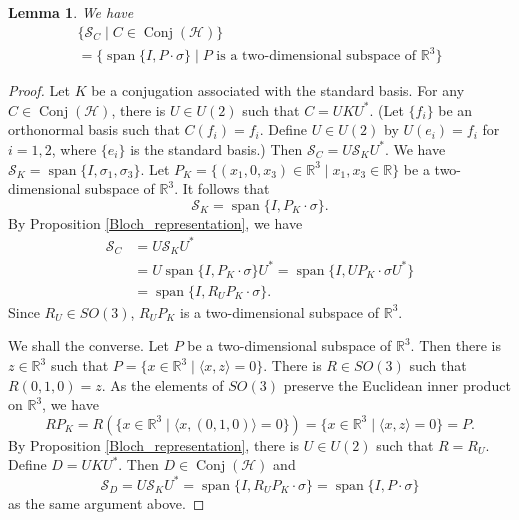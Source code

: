 \documentclass[11pt]{amsart}
\newtheorem{lemma}[theorem]{Lemma}
\theoremstyle{remark}
\newcommand{\cH}{{\mathcal{H}}}
\newcommand{\SC}{\mathcal{S}_C}
\newcommand{\Conj}{\operatorname{Conj}(\cH)}
\newcommand{\la}{\langle}
\newcommand{\ra}{\rangle}
\newcommand{\Span}{\operatorname{span}}
\begin{document}
\begin{lemma}\label{plane}
We have
\begin{multline*}
    \{\SC \mid C \in \Conj\}\\=\{\Span\{I, P\cdot\sigma\} \mid P \text{ is  a two-dimensional subspace of $\mathbb{R}^3$}\}
\end{multline*}
\end{lemma}
\begin{proof}
Let $K$ be a conjugation associated with the standard basis. For any $C \in \Conj$, there is $U \in U(2)$ such that $C=UKU^{*}$. (Let $\{f_i\}$ be an orthonormal basis such that $C(f_i)=f_i$. Define $U \in U(2)$ by $U(e_i)=f_i$ for $i=1,2$, where $\{e_i\}$ is the standard basis.) Then $\SC=U\mathcal{S}_KU^{*}$. We have $\mathcal{S}_K=\Span\{I, \sigma_1, \sigma_3\}$. Let $P_K=\{ (x_1,0,x_3) \in \mathbb{R}^3 \mid x_1, x_3 \in \mathbb{R}\}$ be a two-dimensional subspace of $\mathbb{R}^3$. It follows that 
\[
\mathcal{S}_K=\Span\{I, P_K \cdot \sigma\}.
\]
By Proposition \ref{Bloch_representation}, we have
\begin{equation*}
\begin{split}
\SC&=U\mathcal{S}_KU^{*}\\
&=U\Span\{I, P_K \cdot \sigma\}U^{*}=\Span\{I, U P_K \cdot \sigma U^{*}\}\\
&=\Span\{I, R_U P_K \cdot \sigma \}.
\end{split}
\end{equation*}
Since $R_U \in SO(3)$, $R_U P_K$ is  a two-dimensional subspace of $\mathbb{R}^3$. 


We shall the converse. Let $P$ be a two-dimensional subspace of $\mathbb{R}^3$. Then there is $z \in \mathbb{R}^3$ such that $P=\{x \in \mathbb{R}^3 \mid \la x, z\ra=0\}$. There is $R \in SO(3)$ such that $R(0,1,0)=z$. As  the elements of $SO(3)$ preserve the Euclidean inner product on $\mathbb R^3$, we have  
\[
RP_K=R(\{x \in \mathbb{R}^3 \mid \la x, (0,1,0)\ra =0\})=\{x \in \mathbb{R}^3 \mid \la x, z\ra=0\}=P.
\]
By Proposition \ref{Bloch_representation}, there is $U \in U(2)$ such that $R=R_U$. Define $D=UKU^{*}$. Then $D \in \Conj$ and 
\[
\mathcal{S}_D=U\mathcal{S}_KU^{*}=\Span\{I, R_U P_K \cdot \sigma \}=\Span\{I, P \cdot \sigma \}
\]
as the same argument above. 
\end{proof}
\end{document}
